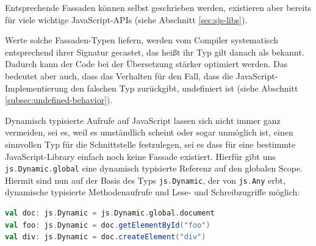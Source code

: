 \documentclass[a4paper, 12pt, hidelinks, listof=totoc, listoftables=totoc, bibliography=totoc]{scrreprt}
\newcommand{\scala}[1]{\lstinline[language=Scala, style=inline]|#1|}
\begin{document}
Entsprechende Fassaden können selbst geschrieben werden, existieren aber bereits für viele wichtige JavaScript-APIs (siehe Abschnitt \ref{sec:sjs-libs}).

%
%

Werte solche Fassaden-Typen liefern, werden vom Compiler systematisch entsprechend ihrer Signatur gecastet, das heißt ihr Typ gilt danach als bekannt. Dadurch kann der Code bei der Übersetzung stärker optimiert werden. Das bedeutet aber auch, dass das Verhalten für den Fall, dass die JavaScript-Implementierung den falschen Typ zurückgibt, undefiniert ist
(siehe Abschnitt \ref{subsec:undefined-behavior}).\cite[Folie 40, Min. 33]{doeraene2015.SSP}

Dynamisch typisierte Aufrufe auf JavaScript lassen sich nicht immer ganz vermeiden, sei es, weil es umständlich scheint oder sogar unmöglich ist, einen sinnvollen Typ für die Schnittstelle festzulegen, sei es dass für eine bestimmte JavaScript-Library einfach noch keine Fassade existiert. Hierfür gibt uns \scala{js.Dynamic.global} eine dynamisch typisierte Referenz auf den globalen Scope. Hiermit sind nun auf der Basis des Typs \scala{js.Dynamic}, der von \scala{js.Any} erbt, dynamische typisierte Methodenaufrufe und Lese- und Schreibzugriffe möglich:

\begin{lstlisting}[language=Scala, style=snippet]
val doc: js.Dynamic = js.Dynamic.global.document
val foo: js.Dynamic = doc.getElementById("foo")
val div: js.Dynamic = doc.createElement("div")
\end{lstlisting}
\end{document}
